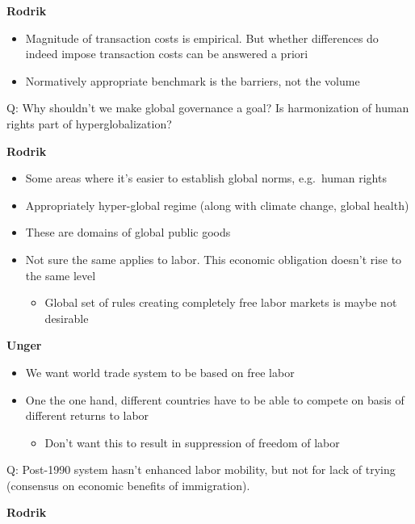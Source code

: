 \textbf{Rodrik}

\begin{itemize}
\tightlist
\item
  Magnitude of transaction costs is empirical. But whether differences
  do indeed impose transaction costs can be answered a priori
\item
  Normatively appropriate benchmark is the barriers, not the volume
\end{itemize}

Q: Why shouldn't we make global governance a goal? Is harmonization of
human rights part of hyperglobalization?

\textbf{Rodrik}

\begin{itemize}
\tightlist
\item
  Some areas where it's easier to establish global norms, e.g.~human
  rights
\item
  Appropriately hyper-global regime (along with climate change, global
  health)
\item
  These are domains of global public goods
\item
  Not sure the same applies to labor. This economic obligation doesn't
  rise to the same level

  \begin{itemize}
  \tightlist
  \item
    Global set of rules creating completely free labor markets is maybe
    not desirable
  \end{itemize}
\end{itemize}

\textbf{Unger}

\begin{itemize}
\tightlist
\item
  We want world trade system to be based on free labor
\item
  One the one hand, different countries have to be able to compete on
  basis of different returns to labor

  \begin{itemize}
  \tightlist
  \item
    Don't want this to result in suppression of freedom of labor
  \end{itemize}
\end{itemize}

Q: Post-1990 system hasn't enhanced labor mobility, but not for lack of
trying (consensus on economic benefits of immigration).

\textbf{Rodrik}

